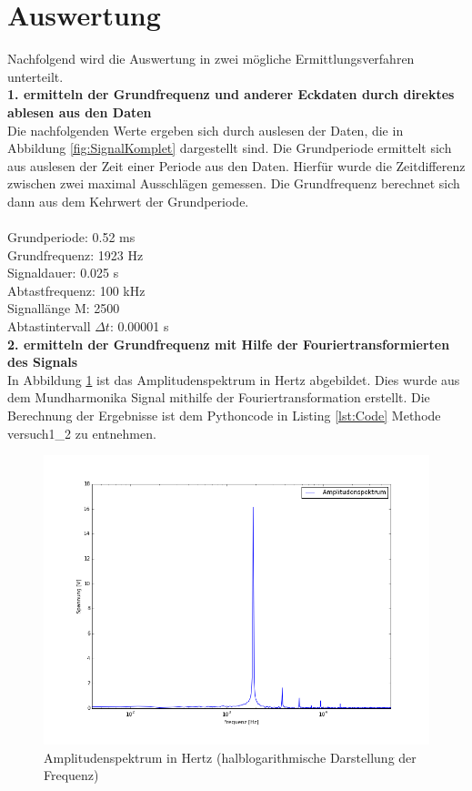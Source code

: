 \documentclass[12pt,oneside,a4paper]{report}
\begin{document}
\section{Auswertung}
\label{chap:VERSUCH_1_AUSWERTUNG}
Nachfolgend wird die Auswertung in zwei mögliche Ermittlungsverfahren unterteilt. \\

\textbf{1. ermitteln der Grundfrequenz und anderer Eckdaten durch direktes ablesen aus den Daten}\\
Die nachfolgenden Werte ergeben sich durch auslesen der Daten, die in Abbildung \ref{fig:SignalKomplet} dargestellt sind.  Die Grundperiode ermittelt sich aus auslesen der Zeit einer Periode aus den Daten. Hierfür wurde die Zeitdifferenz zwischen zwei maximal Ausschlägen gemessen. 
Die Grundfrequenz berechnet sich dann aus dem Kehrwert der Grundperiode. \\
\\
Grundperiode: 0.52 ms \\
Grundfrequenz: 1923 Hz \\
Signaldauer: 0.025 s \\
Abtastfrequenz: 100 kHz \\
Signallänge M: 2500 \\
Abtastintervall $\Delta t$: 0.00001 s \\

\textbf{2. ermitteln der Grundfrequenz mit Hilfe der Fouriertransformierten des Signals} \\
In Abbildung \ref{fig:Spektrum} ist das Amplitudenspektrum in Hertz abgebildet. Dies wurde aus dem Mundharmonika Signal mithilfe der Fouriertransformation erstellt. Die Berechnung der Ergebnisse ist dem Pythoncode in Listing \ref{lst:Code} Methode versuch1\_2 zu entnehmen.

\begin{figure}[H]
	\centering\small
	\includegraphics[width=\textwidth]{src/V1_2_Amplitudenspektrum.png}
	\caption{Amplitudenspektrum in Hertz (halblogarithmische Darstellung der Frequenz)}
	\label{fig:Spektrum}
\end{figure}
\end{document}
